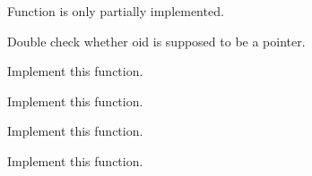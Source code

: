 
\begin{DoxyRefList}
\item[Member \mbox{\hyperlink{classCMpeg_a30ae951a3e8191abfeb0b0ab255d4f79}{C\+Mpeg::Execute}} (O\+ID $\ast$oid)]\label{todo__todo000008}%
%
Function is only partially implemented. 

Double check whether oid is supposed to be a pointer.  
\item[Member \mbox{\hyperlink{classCMpeg_a2e5213e17d42e3b170cb761c4d0b0f0b}{C\+Mpeg::Finish}} ()]\label{todo__todo000011}%
%
Implement this function.  
\item[Member \mbox{\hyperlink{classCMpeg_a9b83f6ada357c46a81102fc2943af749}{C\+Mpeg::Start}} ()]\label{todo__todo000009}%
%
Implement this function.  
\item[Member \mbox{\hyperlink{classCMpeg_a5b20d64ead0378e8c2fd6be15d748523}{C\+Mpeg::Update}} ()]\label{todo__todo000010}%
%
Implement this function.  
\item[Member \mbox{\hyperlink{gs_8h_a7d3a7ac7c0521091d5d3e3a855d3bc3a}{F\+Game\+Completion}} ()]\label{todo__todo000005}%
%
Implement this function. 
\end{DoxyRefList}
